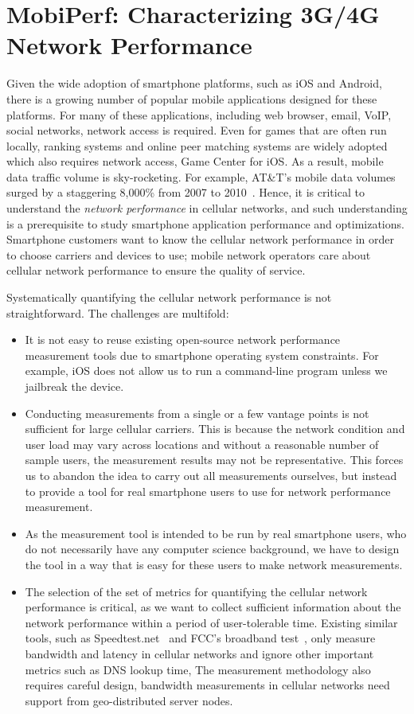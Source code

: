 \chapter{MobiPerf: Characterizing 3G/4G Network Performance} \label{chap:net}

Given the wide adoption of smartphone platforms, such as iOS and Android, there is a growing number of popular mobile applications designed for these platforms. For many of these applications, including web browser, email, VoIP, social networks, network access is required. Even for games that are often run locally, ranking systems and online peer matching systems are widely adopted which also requires network access, \eg Game Center for iOS. As a result, mobile data traffic volume is sky-rocketing. For example, AT\&T's mobile data volumes surged by a staggering 8,000\% from 2007 to 2010~\cite{att.overload}. Hence, it is critical to understand the {\em network performance} in cellular networks, and such understanding is a prerequisite to study smartphone application performance and optimizations. Smartphone customers want to know the cellular network performance in order to choose carriers and devices to use; mobile network operators care about cellular network performance to ensure the quality of service.

Systematically quantifying the cellular network performance is not straightforward. The challenges are multifold:
\begin{itemize}
\item It is not easy to reuse existing open-source network performance measurement tools due to smartphone operating system constraints. For example, iOS does not allow us to run a command-line program unless we jailbreak the device.
\item Conducting measurements from a single or a few vantage points is not sufficient for large cellular carriers. This is because the network condition and user load may vary across locations and without a reasonable number of sample users, the measurement results may not be representative. This forces us to abandon the idea to carry out all measurements ourselves, but instead to provide a tool for real smartphone users to use for network performance measurement.
\item As the measurement tool is intended to be run by real smartphone users, who do not necessarily have any computer science background, we have to design the tool in a way that is easy for these users to make network measurements.
\item The selection of the set of metrics for quantifying the cellular network performance is critical, as we want to collect sufficient information about the network performance within a period of user-tolerable time. Existing similar tools, such as Speedtest.net~\cite{speedtestnet} 
and FCC's broadband test~\cite{fccspeedtest}, only measure bandwidth and latency in cellular networks and ignore other important metrics such as DNS lookup time, \etc The measurement methodology also requires careful design, \eg bandwidth measurements in cellular networks need support from geo-distributed server nodes.
\end{itemize}


